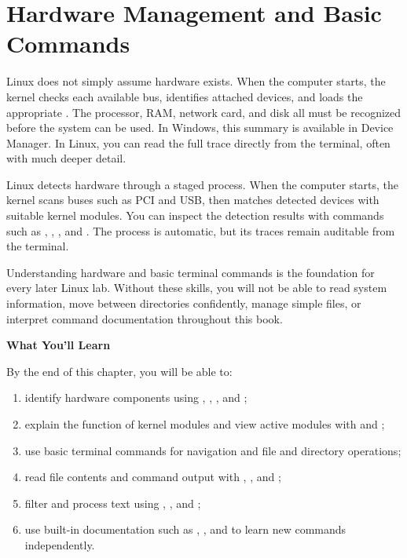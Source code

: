 
\chapter{Hardware Management and Basic Commands}
\label{ch:hardware-and-basic-commands}


Linux does not simply assume hardware exists. When the computer starts, the kernel checks each available bus, identifies attached devices, and loads the appropriate . The processor, RAM, network card, and disk all must be recognized before the system can be used. In Windows, this summary is available in Device Manager. In Linux, you can read the full trace directly from the terminal, often with much deeper detail.

Linux detects hardware through a staged process. When the computer starts, the kernel scans buses such as PCI and USB, then matches detected devices with suitable kernel modules. You can inspect the detection results with commands such as , , , and . The process is automatic, but its traces remain auditable from the terminal.

Understanding hardware and basic terminal commands is the foundation for every later Linux lab. Without these skills, you will not be able to read system information, move between directories confidently, manage simple files, or interpret command documentation throughout this book.

\textbf{What You'll Learn}

By the end of this chapter, you will be able to:

\begin{enumerate}
    \item identify hardware components using , , , and ;
    \item explain the function of kernel modules and view active modules with  and ;
    \item use basic terminal commands for navigation and file and directory operations;
    \item read file contents and command output with , , and ;
    \item filter and process text using , , and ;
    \item use built-in documentation such as , , and  to learn new commands independently.
\end{enumerate}

